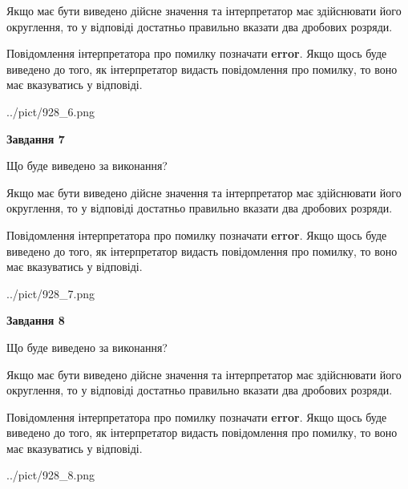 \documentclass[12pt, ukrainian]{article}
\begin{document}
{\begin {Large}
Якщо має бути виведено дійсне значення та інтерпретатор має здійснювати його округлення, 
то у відповіді достатньо правильно вказати два дробових розряди.

Повідомлення інтерпретатора про помилку позначати \textbf{error}.
Якщо щось буде виведено до того, як інтерпретатор видасть повідомлення про помилку, 
то воно має вказуватись у відповіді. \par

\begin{center}
	{../pict/928_6.png}
\end{center}
\newpage

{\begin {center}\textbf{Завдання 7}\end {center}}\par
Що буде виведено за виконання? \par

Якщо має бути виведено дійсне значення та інтерпретатор має здійснювати його округлення, 
то у відповіді достатньо правильно вказати два дробових розряди.

Повідомлення інтерпретатора про помилку позначати \textbf{error}.
Якщо щось буде виведено до того, як інтерпретатор видасть повідомлення про помилку, 
то воно має вказуватись у відповіді. \par

\begin{center}
	{../pict/928_7.png}
\end{center}
\newpage

{\begin {center}\textbf{Завдання 8}\end {center}}\par
Що буде виведено за виконання? \par

Якщо має бути виведено дійсне значення та інтерпретатор має здійснювати його округлення, 
то у відповіді достатньо правильно вказати два дробових розряди.

Повідомлення інтерпретатора про помилку позначати \textbf{error}.
Якщо щось буде виведено до того, як інтерпретатор видасть повідомлення про помилку, 
то воно має вказуватись у відповіді. \par

\begin{center}
	{../pict/928_8.png}
\end{center}
\newpage


\end{Large}}
\end{document}
